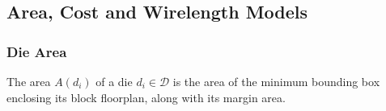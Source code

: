 \subsection{Area, Cost and Wirelength Models}
\label{sec:models}


\subsubsection{Die Area}
The area $A(d_i)$ of a die $d_i \in \mathcal{D}$ is the area of the minimum bounding box enclosing its block floorplan, along with its margin area.

